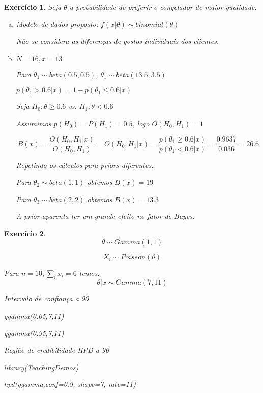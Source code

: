 \documentclass[letter,11pt]{article}
\newtheorem{exer}{Exercício}
\begin{document}
\begin{exer} \rm
 Seja $\theta$ a probabilidade de preferir o congelador de maior qualidade.

\begin{enumerate}[a)]
\item Modelo de dados proposto: $f(x|\theta) \sim binomial(\theta)$

Não se considera as diferenças de gostos individuais dos clientes.

\item $N=16,x=13$

Para $\theta_1 \sim beta(0.5,0.5)$, $\theta_1 \sim beta(13.5,3.5)$


$p(\theta_1 > 0.6 | x) = 1 - p(\theta_1 \leq 0.6 | x)$

Seja $H_0:\theta \geq 0.6$ vs. $H_1:\theta < 0.6$

Assumimos $p(H_0) = P(H_1) = 0.5$, logo $O(H_0,H_1) = 1$

$$B(x) = \frac{O(H_0,H_1|x)}{O(H_0,H_1)} = O(H_0,H_1|x) = \frac{p(\theta_1 \geq 0.6 | x)}{p(\theta_1 < 0.6 | x)} = \frac{0.9637}{0.036} = 26.6$$

Repetindo os cálculos para priors diferentes:

Para $\theta_2 \sim beta(1,1)$ obtemos $B(x) = 19$

Para $\theta_3 \sim beta(2,2)$ obtemos $B(x) = 13.3$

A prior aparenta ter um grande efeito no fator de Bayes.
\end{enumerate} 
\end{exer}


\begin{exer} $$\theta \sim Gamma(1,1)$$

$$X_i \sim Poisson(\theta)$$

Para $n=10, \sum_i x_i = 6$ temos:
$$\theta | x \sim Gamma(7,11)$$

Intervalo de confiança a 90%


qgamma(0.05,7,11)

qgamma(0.95,7,11)


Região de credibilidade HPD a 90%


library(TeachingDemos)

hpd(qgamma,conf=0.9, shape=7, rate=11)
\end{exer}
\end{document}
